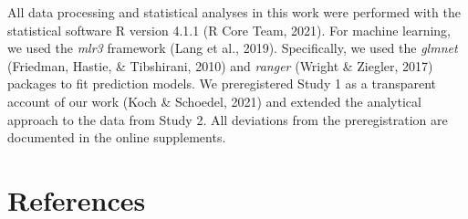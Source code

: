 \documentclass[
  english,
  man,floatsintext]{apa6}
\begin{document}
All data processing and statistical analyses in this work were performed with the statistical software R version 4.1.1 (R Core Team, 2021). For machine learning, we used the \emph{mlr3} framework (Lang et al., 2019). Specifically, we used the \emph{glmnet} (Friedman, Hastie, \& Tibshirani, 2010) and \emph{ranger} (Wright \& Ziegler, 2017) packages to fit prediction models. We preregistered Study 1 as a transparent account of our work (Koch \& Schoedel, 2021) and extended the analytical approach to the data from Study 2. All deviations from the preregistration are documented in the online supplements.

\newpage

\hypertarget{references}{%
\section{References}\label{references}}
\end{document}
